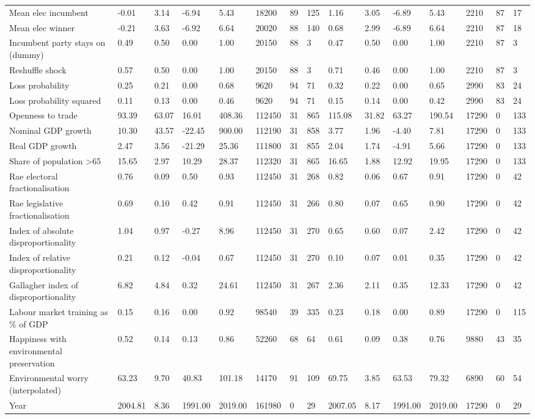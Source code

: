 \begin{longtable}{lllllllllllllll}
Mean elec incumbent & -0.01 & 3.14 & -6.94 & 5.43 & 18200 & 89 & 125 & 1.16 & 3.05 & -6.89 & 5.43 & 2210 & 87 & 17\\
Mean elec winner & -0.21 & 3.63 & -6.92 & 6.64 & 20020 & 88 & 140 & 0.68 & 2.99 & -6.89 & 6.64 & 2210 & 87 & 18\\
Incumbent party stays on (dummy) & 0.49 & 0.50 & 0.00 & 1.00 & 20150 & 88 & 3 & 0.47 & 0.50 & 0.00 & 1.00 & 2210 & 87 & 3\\
Reshuffle shock & 0.57 & 0.50 & 0.00 & 1.00 & 20150 & 88 & 3 & 0.71 & 0.46 & 0.00 & 1.00 & 2210 & 87 & 3\\
\addlinespace
Loss probability & 0.25 & 0.21 & 0.00 & 0.68 & 9620 & 94 & 71 & 0.32 & 0.22 & 0.00 & 0.65 & 2990 & 83 & 24\\
Loss probability squared & 0.11 & 0.13 & 0.00 & 0.46 & 9620 & 94 & 71 & 0.15 & 0.14 & 0.00 & 0.42 & 2990 & 83 & 24\\
Openness to trade & 93.39 & 63.07 & 16.01 & 408.36 & 112450 & 31 & 865 & 115.08 & 31.82 & 63.27 & 190.54 & 17290 & 0 & 133\\
Nominal GDP growth & 10.30 & 43.57 & -22.45 & 900.00 & 112190 & 31 & 858 & 3.77 & 1.96 & -4.40 & 7.81 & 17290 & 0 & 133\\
Real GDP growth & 2.47 & 3.56 & -21.29 & 25.36 & 111800 & 31 & 855 & 2.04 & 1.74 & -4.91 & 5.66 & 17290 & 0 & 133\\
\addlinespace
Share of population >65 & 15.65 & 2.97 & 10.29 & 28.37 & 112320 & 31 & 865 & 16.65 & 1.88 & 12.92 & 19.95 & 17290 & 0 & 133\\
Rae electoral fractionalisation & 0.76 & 0.09 & 0.50 & 0.93 & 112450 & 31 & 268 & 0.82 & 0.06 & 0.67 & 0.91 & 17290 & 0 & 42\\
Rae legislative fractionalisation & 0.69 & 0.10 & 0.42 & 0.91 & 112450 & 31 & 266 & 0.80 & 0.07 & 0.65 & 0.90 & 17290 & 0 & 42\\
Index of absolute disproportionality & 1.04 & 0.97 & -0.27 & 8.96 & 112450 & 31 & 270 & 0.65 & 0.60 & 0.07 & 2.42 & 17290 & 0 & 42\\
Index of relative disproportionality & 0.21 & 0.12 & -0.04 & 0.67 & 112450 & 31 & 270 & 0.10 & 0.07 & 0.01 & 0.35 & 17290 & 0 & 42\\
\addlinespace
Gallagher index of disproportionality & 6.82 & 4.84 & 0.32 & 24.61 & 112450 & 31 & 267 & 2.36 & 2.11 & 0.35 & 12.33 & 17290 & 0 & 42\\
Labour market training as \% of GDP & 0.15 & 0.16 & 0.00 & 0.92 & 98540 & 39 & 335 & 0.23 & 0.18 & 0.00 & 0.89 & 17290 & 0 & 115\\
Happiness with environmental preservation & 0.52 & 0.14 & 0.13 & 0.86 & 52260 & 68 & 64 & 0.61 & 0.09 & 0.38 & 0.76 & 9880 & 43 & 35\\
Environmental worry (interpolated) & 63.23 & 9.70 & 40.83 & 101.18 & 14170 & 91 & 109 & 69.75 & 3.85 & 63.53 & 79.32 & 6890 & 60 & 54\\
Year & 2004.81 & 8.36 & 1991.00 & 2019.00 & 161980 & 0 & 29 & 2007.05 & 8.17 & 1991.00 & 2019.00 & 17290 & 0 & 29\\
\bottomrule
\end{longtable}
